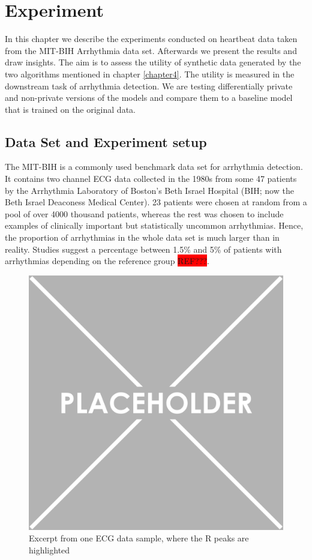 \section{Experiment}
In this chapter we describe the experiments conducted on heartbeat data taken from the MIT-BIH Arrhythmia data set. Afterwards we present the results and draw insights. The aim is to assess the utility of synthetic data generated by the two algorithms mentioned in chapter \ref{chapter4}. The utility is measured in the downstream task of arrhythmia detection. We are testing differentially private and non-private versions of the models and compare them to a baseline model that is trained on the original data.

\subsection{Data Set and Experiment setup}
The MIT-BIH is a commonly used benchmark data set for arrhythmia detection. It contains two channel ECG data collected in the 1980s from some 47 patients by the Arrhythmia Laboratory of Boston's Beth Israel Hospital (BIH; now the Beth Israel Deaconess Medical Center). 23 patients were chosen at random from a pool of over 4000 thousand patients, whereas the rest was chosen to include examples of clinically important but statistically uncommon arrhythmias. Hence, the proportion of arrhythmias in the whole data set is much larger than in reality. Studies suggest a percentage between 1.5\% and 5\% of patients with arrhythmias depending on the reference group \colorbox{red}{REF???}. 

\begin{figure}[h]
    \centering
    \includegraphics[scale=0.5]{../images/placeholder.png}
    \caption[short]{Excerpt from one ECG data sample, where the R peaks are highlighted}
\end{figure}

